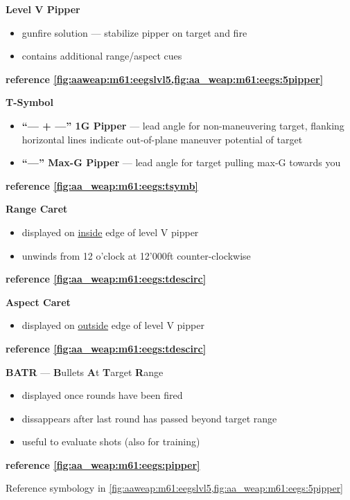 \begin{tcoloritemize}
{    \begin{subitemize}
        \item \textbf{Level V Pipper}
        \begin{itemize}
            \item gunfire solution --- stabilize pipper on target and fire
            \item contains additional range/aspect cues
        \end{itemize}
        \textbf{reference \cref{fig:aaweap:m61:eegslvl5,fig:aa_weap:m61:eegs:5pipper}}
        \item \textbf{T-Symbol}
        \begin{itemize}
            \item \textbf{``--- + ---'' 1G Pipper} --- lead angle for non-maneuvering target,
            flanking horizontal lines indicate out-of-plane maneuver potential of target
            \item \textbf{``---'' Max-G Pipper} --- lead angle for target pulling max-G towards you
        \end{itemize}
        \textbf{reference \cref{fig:aa_weap:m61:eegs:tsymb}}
        \item \textbf{Range Caret}
        \begin{itemize}
            \item displayed on \underline{inside} edge of level V pipper
            \item unwinds from 12 o'clock at 12'000ft counter-clockwise
        \end{itemize}
        \textbf{reference \cref{fig:aa_weap:m61:eegs:tdescirc}}
        \item \textbf{Aspect Caret} 
        \begin{itemize}
            \item displayed on \underline{outside} edge of level V pipper
        \end{itemize}
        \textbf{reference \cref{fig:aa_weap:m61:eegs:tdescirc}}
        \item \textbf{BATR} --- \textbf{B}ullets \textbf{A}t \textbf{T}arget \textbf{R}ange
        \begin{itemize}
            \item displayed once rounds have been fired
            \item dissappears after last round has passed beyond target range
            \item useful to evaluate shots (also for training)
        \end{itemize}
        \textbf{reference \cref{fig:aa_weap:m61:eegs:pipper}}
    \end{subitemize}
    
    Reference symbology in \cref{fig:aaweap:m61:eegslvl5,fig:aa_weap:m61:eegs:5pipper}
    }
\end{tcoloritemize}

